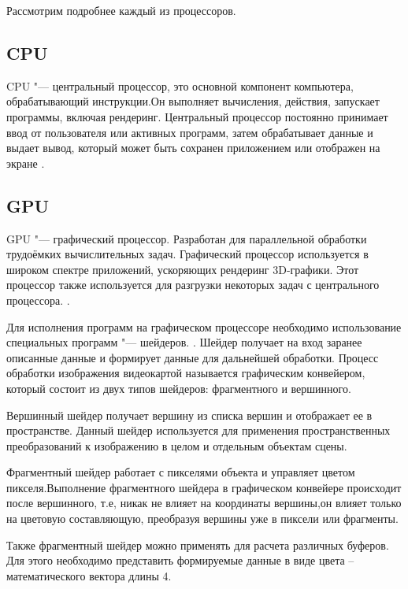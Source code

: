 Рассмотрим подробнее каждый из процессоров.

\subsection{CPU}
CPU "--- центральный процессор, это основной компонент компьютера, обрабатывающий инструкции.Он выполняет вычисления, действия, запускает программы, включая рендеринг. Центральный процессор постоянно принимает ввод от пользователя или активных программ, затем обрабатывает данные и выдает вывод, который может быть сохранен приложением или отображен на экране \cite{article:cpu_gpu}.

\subsection{GPU}

GPU "--- графический процессор. Разработан для параллельной обработки трудоёмких вычислительных задач.  Графический процессор используется в широком спектре приложений, ускоряющих рендеринг 3D-графики.  Этот процессор также используется для разгрузки некоторых задач с центрального процессора. \cite{article:cpu_gpu}.

Для исполнения программ на графическом процессоре необходимо использование специальных программ "--- шейдеров. \cite{article:shaders}. Шейдер получает на вход заранее описанные данные и формирует данные для дальнейшей обработки. Процесс обработки изображения видеокартой называется графическим конвейером, который состоит из двух типов шейдеров: фрагментного и вершинного.

Вершинный шейдер получает вершину из списка вершин и отображает ее в пространстве. Данный шейдер используется для применения пространственных преобразований к изображению в целом и отдельным объектам сцены.

Фрагментный шейдер работает с пикселями объекта и управляет цветом пикселя.Выполнение фрагментного шейдера в графическом конвейере происходит после вершинного, т.е, никак не влияет на координаты вершины,он влияет только на цветовую составляющую, преобразуя вершины уже в пиксели или фрагменты.

Также фрагментный шейдер можно применять для расчета различных буферов. Для этого необходимо представить формируемые данные в виде цвета -- математического вектора длины 4.

